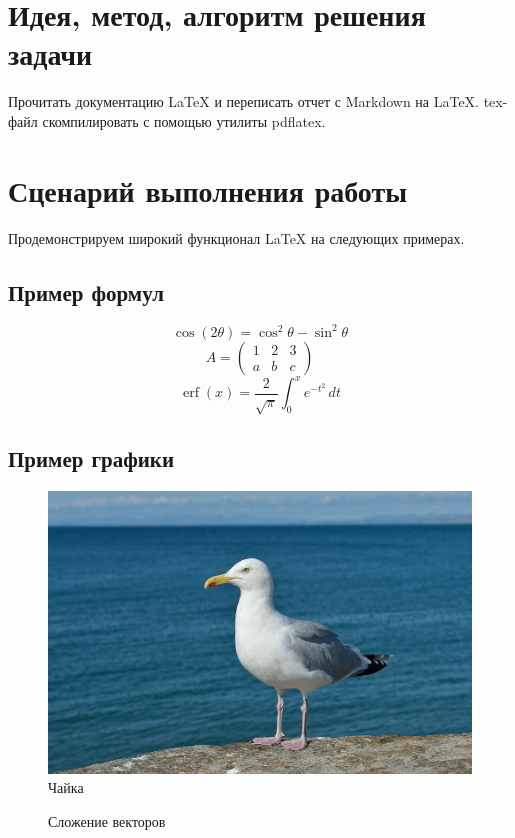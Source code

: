 \documentclass[12pt, letterpaper]{article}
\DeclareMathOperator\erf{erf}
\begin{document}
\section{Идея, метод, алгоритм решения задачи}
Прочитать документацию \LaTeX{} и переписать отчет с Markdown на \LaTeX{}. tex-файл скомпилировать с помощью утилиты pdflatex.
\section{Сценарий выполнения работы}
Продемонстрируем широкий функционал \LaTeX{} на следующих примерах.
\subsection{Пример формул}
\[\cos (2\theta) = \cos^2 \theta - \sin^2 \theta\]
\[A=
\begin{pmatrix}
1 & 2 & 3\\
a & b & c
\end{pmatrix}\]
\[
\erf(x)=\frac{2}{\sqrt{\pi}}\int_{0}^{x}e^{-t^{2}}\, dt
\]

\subsection{Пример графики}
\begin{figure}[H]
\includegraphics{gull}
\centering
\caption{Чайка}
\end{figure}
\begin{figure}[H]
\centering
\caption{Сложение векторов}
\end{figure}
\end{document}
